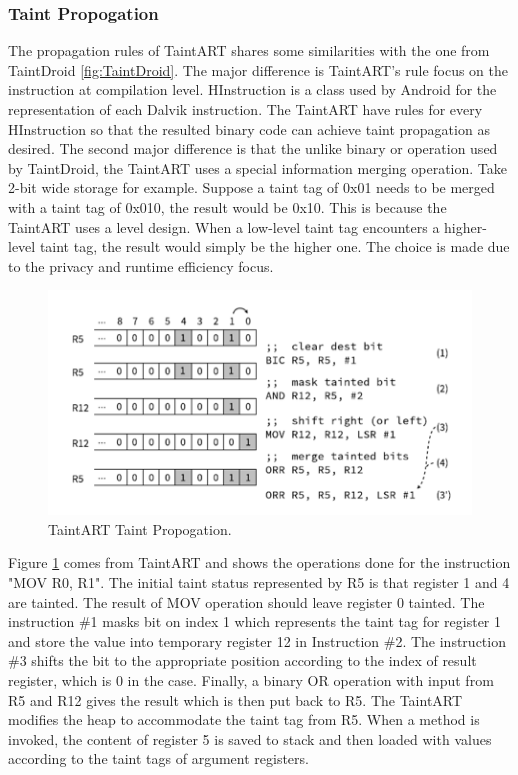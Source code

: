 \documentclass{article}
\begin{document}
\subsubsection{Taint Propogation}
The propagation rules of TaintART shares some similarities with the one from TaintDroid \ref{fig:TaintDroid}. The major difference is TaintART’s rule focus on the instruction at compilation level. HInstruction is a class used by Android for the representation of each Dalvik instruction. The TaintART have rules for every HInstruction so that the resulted binary code can achieve taint propagation as desired. The second major difference is that the unlike binary or operation used by TaintDroid, the TaintART uses a special information merging operation. Take 2-bit wide storage for example. Suppose a taint tag of 0x01 needs to be merged with a taint tag of 0x010, the result would be 0x10. This is because the TaintART uses a level design. When a low-level taint tag encounters a higher-level taint tag, the result would simply be the higher one. The choice is made due to the privacy and runtime efficiency focus.
\begin{figure}[ht]
  \centering
  \includegraphics[scale=0.4]{TaintART3.png}
  \caption{TaintART Taint Propogation.}
  \label{fig:TaintART3}
\end{figure}

Figure \ref{fig:TaintART3} comes from TaintART and shows the operations done for the instruction "MOV R0, R1". The initial taint status represented by R5 is that register 1 and 4 are tainted. The result of MOV operation should leave register 0 tainted. The instruction \#1 masks bit on index 1 which represents the taint tag for register 1 and store the value into temporary register 12 in Instruction \#2. The instruction \#3 shifts the bit to the appropriate position according to the index of result register, which is 0 in the case. Finally, a binary OR operation with input from R5 and R12 gives the result which is then put back to R5. The TaintART modifies the heap to accommodate the taint tag from R5. When a method is invoked, the content of register 5 is saved to stack and then loaded with values according to the taint tags of argument registers.
\end{document}
